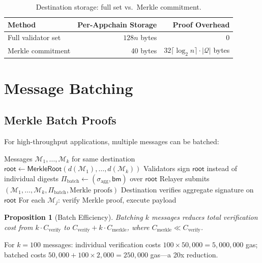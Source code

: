 \documentclass[11pt,a4paper]{article}
\newtheorem{proposition}[theorem]{Proposition}
\begin{document}
\begin{table}[H]
\centering
\caption{Destination storage: full set vs.\ Merkle commitment.}
\label{tab:storage}
\begin{tabular}{lrr}
\toprule
\textbf{Method} & \textbf{Per-Appchain Storage} & \textbf{Proof Overhead} \\
\midrule
Full validator set & $128n$ bytes & 0 \\
Merkle commitment & 40 bytes & $32 \lceil\log_2 n\rceil \cdot |\mathcal{Q}|$ bytes \\
\bottomrule
\end{tabular}
\end{table}

\section{Message Batching}\label{sec:batching}

\subsection{Merkle Batch Proofs}

For high-throughput applications, multiple messages can be batched:

\begin{algorithm}[H]
\caption{Batched Warp Delivery}
\label{alg:batch}
\begin{algorithmic}[1]
\Require Messages $\mathcal{M}_1, \ldots, \mathcal{M}_k$ for same destination
\State $\mathsf{root} \gets \mathsf{MerkleRoot}(d(\mathcal{M}_1), \ldots, d(\mathcal{M}_k))$
\State Validators sign $\mathsf{root}$ instead of individual digests
\State $\Pi_{\text{batch}} \gets (\sigma_{\text{agg}}, \mathsf{bm})$ over $\mathsf{root}$
\State Relayer submits $(\mathcal{M}_1, \ldots, \mathcal{M}_k, \Pi_{\text{batch}}, \text{Merkle proofs})$
\State Destination verifies aggregate signature on $\mathsf{root}$
\State For each $\mathcal{M}_j$: verify Merkle proof, execute payload
\end{algorithmic}
\end{algorithm}

\begin{proposition}[Batch Efficiency]
Batching $k$ messages reduces total verification cost from $k \cdot C_{\text{verify}}$ to $C_{\text{verify}} + k \cdot C_{\text{merkle}}$, where $C_{\text{merkle}} \ll C_{\text{verify}}$.
\end{proposition}

For $k = 100$ messages: individual verification costs $100 \times 50{,}000 = 5{,}000{,}000$ gas; batched costs $50{,}000 + 100 \times 2{,}000 = 250{,}000$ gas---a 20x reduction.
\end{document}

